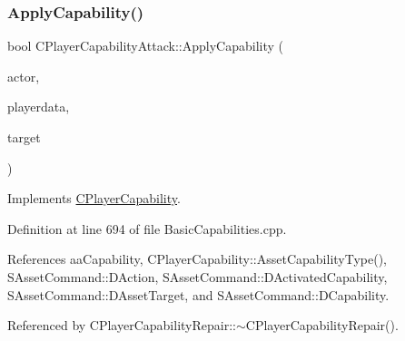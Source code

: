 \subsubsection{\texorpdfstring{Apply\+Capability()}{ApplyCapability()}}
{\footnotesize\ttfamily bool C\+Player\+Capability\+Attack\+::\+Apply\+Capability (\begin{DoxyParamCaption}\item[{std\+::shared\+\_\+ptr$<$ \hyperlink{classCPlayerAsset}{C\+Player\+Asset} $>$}]{actor,  }\item[{std\+::shared\+\_\+ptr$<$ \hyperlink{classCPlayerData}{C\+Player\+Data} $>$}]{playerdata,  }\item[{std\+::shared\+\_\+ptr$<$ \hyperlink{classCPlayerAsset}{C\+Player\+Asset} $>$}]{target }\end{DoxyParamCaption})\hspace{0.3cm}{\ttfamily [virtual]}}



Implements \hyperlink{classCPlayerCapability_a2ca6fd7fbd9c0178f1cf1d049c63825f}{C\+Player\+Capability}.



Definition at line 694 of file Basic\+Capabilities.\+cpp.



References aa\+Capability, C\+Player\+Capability\+::\+Asset\+Capability\+Type(), S\+Asset\+Command\+::\+D\+Action, S\+Asset\+Command\+::\+D\+Activated\+Capability, S\+Asset\+Command\+::\+D\+Asset\+Target, and S\+Asset\+Command\+::\+D\+Capability.



Referenced by C\+Player\+Capability\+Repair\+::$\sim$\+C\+Player\+Capability\+Repair().


